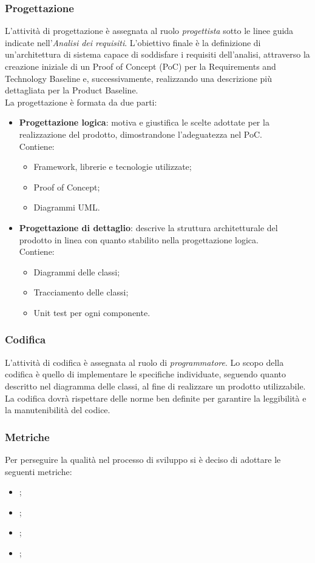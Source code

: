 \subsubsection{Progettazione}
L'attività di progettazione è assegnata al ruolo \textit{progettista} sotto le
linee guida indicate nell'\textit{Analisi dei requisiti}. L'obiettivo finale è
la definizione di un'architettura di sistema capace di soddisfare i requisiti
dell'analisi, attraverso la creazione iniziale di un Proof of Concept (PoC) per
la Requirements and Technology Baseline e, successivamente, realizzando una
descrizione più dettagliata per la Product Baseline. \\La progettazione è
formata da due parti:
\begin{itemize}
    \item \textbf{Progettazione logica}: motiva e giustifica le scelte adottate per la realizzazione del prodotto, dimostrandone l’adeguatezza nel PoC.
          \\Contiene:
          \renewcommand{\labelitemii}{-}
          \begin{itemize}
              \item Framework, librerie e tecnologie utilizzate;
              \item Proof of Concept;
              \item Diagrammi UML.
          \end{itemize}
    \item \textbf{Progettazione di dettaglio}: descrive la struttura architetturale del prodotto in linea con quanto stabilito nella progettazione logica.\\
          Contiene:
          \renewcommand{\labelitemii}{-}
          \begin{itemize}
              \item Diagrammi delle classi;
              \item Tracciamento delle classi;
              \item Unit test per ogni componente.
          \end{itemize}
\end{itemize}

\subsubsection{Codifica}
L'attività di codifica è assegnata al ruolo di \textit{programmatore}. Lo scopo
della codifica è quello di implementare le specifiche individuate, seguendo
quanto descritto nel diagramma delle classi, al fine di realizzare un prodotto
utilizzabile. \\La codifica dovrà rispettare delle norme ben definite per
garantire la leggibilità e la manutenibilità del codice.

\subsubsection{Metriche}
Per perseguire la qualità nel processo di sviluppo si è deciso di adottare le
seguenti metriche:
\begin{itemize}
    \item {};
    \item {};
    \item {};
    \item {};
\end{itemize}

